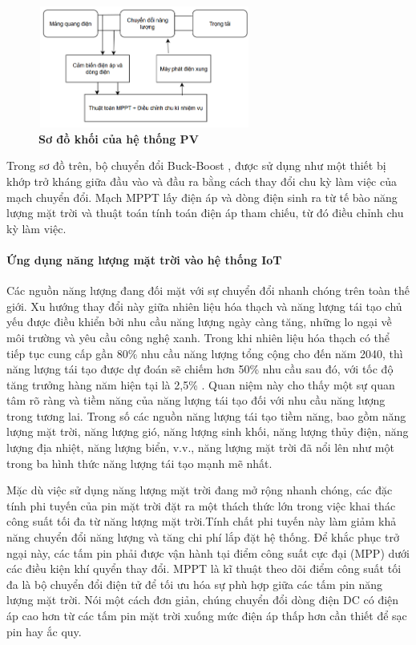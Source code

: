 \documentclass{article} %
\begin{document}
	\begin{figure}[!ht]
		\centering
		\includegraphics[width=7cm,height=4cm]{Images/htPv.png}
		\caption[ Sơ đồ khối của hệ thống PV \cite{batt2022design}]{\bfseries \fontsize{12pt}{0pt}\selectfont  Sơ đồ khối của hệ thống PV \cite{batt2022design} }
		\label{htPv}
	\end{figure}
	
	Trong sơ đồ trên, bộ chuyển đổi Buck-Boost \cite{batt2022design},  được sử dụng như một thiết bị khớp trở kháng giữa đầu vào và đầu ra bằng cách thay đổi chu kỳ làm việc của mạch chuyển đổi. Mạch MPPT lấy điện áp và dòng điện sinh ra từ tế bào năng lượng mặt trời và thuật toán tính toán điện áp tham chiếu, từ đó điều chỉnh chu kỳ làm việc.
	
	\paragraph{Ứng dụng năng lượng mặt trời vào hệ thống IoT}\mbox{}
	
	Các nguồn năng lượng đang đối mặt với sự chuyển đổi nhanh chóng trên toàn thế giới. Xu hướng thay đổi này giữa nhiên liệu hóa thạch và năng lượng tái tạo chủ yếu được điều khiển bởi nhu cầu năng lượng ngày càng tăng, những lo ngại về môi trường và yêu cầu công nghệ xanh. Trong khi nhiên liệu hóa thạch có thể tiếp tục cung cấp gần 80\% nhu cầu năng lượng tổng cộng cho đến năm 2040, thì năng lượng tái tạo được dự đoán sẽ chiếm hơn 50\% nhu cầu sau đó, với tốc độ tăng trưởng hàng năm hiện tại là 2,5\% \cite{rokonuzzaman2020iot}. Quan niệm này cho thấy một sự quan tâm rõ ràng và tiềm năng của năng lượng tái tạo đối với nhu cầu năng lượng trong tương lai. Trong số các nguồn năng lượng tái tạo tiềm năng, bao gồm năng lượng mặt trời, năng lượng gió, năng lượng sinh khối, năng lượng thủy điện, năng lượng địa nhiệt, năng lượng biển, v.v., năng lượng mặt trời đã nổi lên như một trong ba hình thức năng lượng tái tạo mạnh mẽ nhất.
	
	Mặc dù việc sử dụng năng lượng mặt trời đang mở rộng nhanh chóng, các đặc tính phi tuyến của pin mặt trời đặt ra một thách thức lớn trong việc khai thác công suất tối đa từ năng lượng mặt trời.Tính chất phi tuyến này làm giảm khả năng chuyển đổi năng lượng và tăng chi phí lắp đặt hệ thống. Để khắc phục trở ngại này, các tấm pin phải được vận hành tại điểm công suất cực đại (MPP) dưới các điều kiện khí quyển thay đổi. MPPT  là kĩ thuật theo dõi điểm công suất tối đa là bộ chuyển đổi điện tử để tối ưu hóa sự phù hợp giữa các tấm pin năng lượng mặt trời. Nói một cách đơn giản, chúng chuyển đổi dòng điện DC có điện áp cao hơn từ các tấm pin mặt trời xuống mức điện áp thấp hơn cần thiết để sạc pin hay ắc quy. 
	
\end{document}
